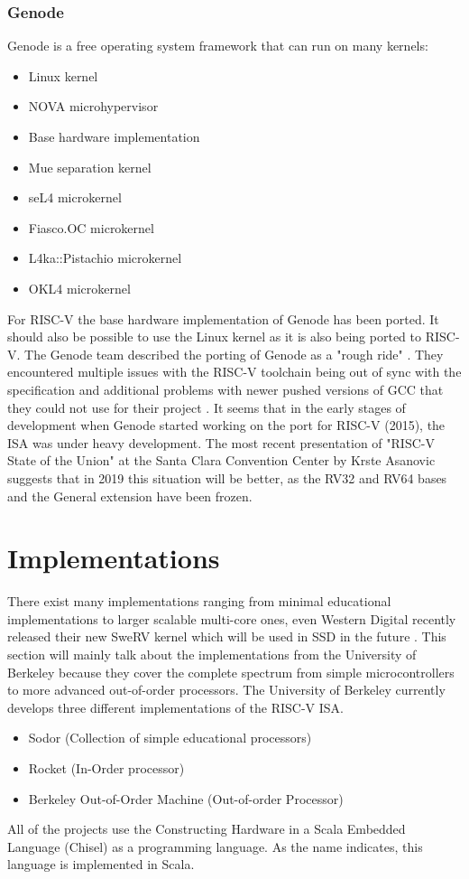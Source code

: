 \subsubsection{Genode}
Genode is a free operating system framework that can run
on many kernels:
\begin{itemize}
    \item{Linux kernel}
    \item{NOVA microhypervisor}
    \item{Base hardware implementation}
    \item{Mue separation kernel}
    \item{seL4 microkernel}
    \item{Fiasco.OC microkernel}
    \item{L4ka::Pistachio microkernel}
    \item{OKL4 microkernel}
\end{itemize}
\cite{genode_platforms} \newline
For RISC-V the base hardware implementation of Genode
has been ported.
It should also be possible to use the Linux kernel as
it is also being ported to RISC-V.
The Genode team described the porting of Genode
as a "rough ride" \cite{genode_risc-v_port}.
They encountered multiple issues with the RISC-V toolchain
being out of sync with the specification and additional
problems with newer pushed versions of GCC that they could
not use for their project \cite{genode_risc-v_port}.
It seems that in the early stages
of development when Genode started working on the port
for RISC-V (2015), the ISA was under heavy development.
The most recent presentation of "RISC-V State of the
Union" at the Santa Clara Convention Center by Krste Asanovic
\cite{risc-v_state_of_the_union_dec_2018}
suggests that in 2019 this situation will be better,
as the RV32 and RV64 bases and the General extension
have been frozen.

\section{Implementations}
There exist many implementations ranging from minimal educational
implementations to larger scalable multi-core ones, 
even Western Digital recently released their new SweRV kernel
which will be used in SSD in the future \cite{anandtech_wd_swerv_ssds}.
This section will mainly talk about the implementations from
the University of Berkeley because they cover the complete spectrum
from simple microcontrollers to more advanced out-of-order
processors.
The University of Berkeley currently develops three different
implementations of the RISC-V ISA.
\begin{itemize}
    \item Sodor (Collection of simple educational processors)
    \item Rocket (In-Order processor)
    \item Berkeley Out-of-Order Machine (Out-of-order Processor)
\end{itemize}
All of the projects use the Constructing Hardware in a Scala
Embedded Language (Chisel) as a programming language. As the
name indicates, this language is implemented in Scala.

